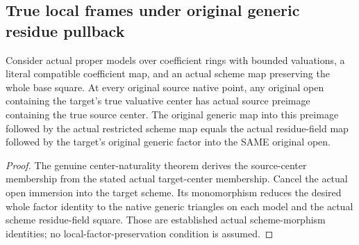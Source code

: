 \subsection{True local frames under original generic residue pullback}

\begin{lemma}
\label{berkovich:actual-generic-local-factor-residue-pullback}
\leanok
Consider actual proper models over coefficient rings with bounded valuations,
a literal compatible coefficient map, and an actual scheme map preserving the
whole base square. At every original source native point, any original open
containing the target's true valuative center has actual source preimage
containing the true source center. The original generic map into this preimage
followed by the actual restricted scheme map equals the actual residue-field
map followed by the target's original generic factor into the SAME original open.
\end{lemma}
\begin{proof}
The genuine center-naturality theorem derives the source-center membership
from the stated actual target-center membership. Cancel the actual open
immersion into the target scheme. Its monomorphism reduces the desired whole
factor identity to the native generic triangles on each model and the actual
scheme residue-field square. Those are established actual scheme-morphism
identities; no local-factor-preservation condition is assumed.
\end{proof}


